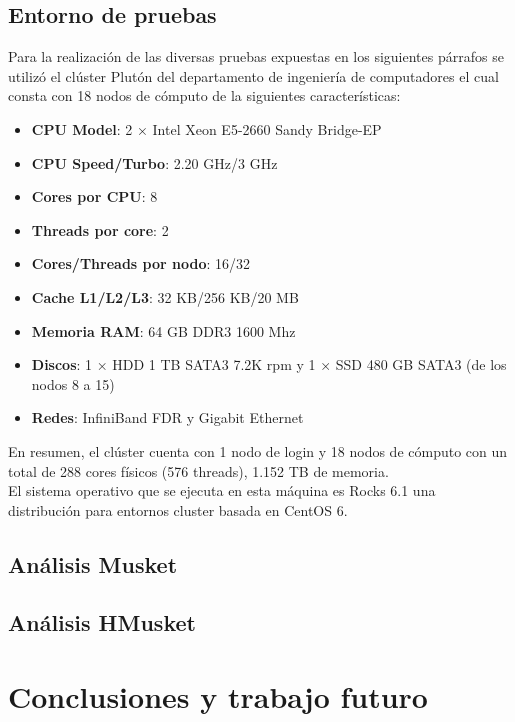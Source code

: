 \documentclass[conference]{IEEEtran}
\begin{document}
\subsection{Entorno de pruebas}
Para la realización de las diversas pruebas expuestas en los siguientes párrafos se utilizó el clúster Plutón del departamento de ingeniería de computadores el cual consta con 18 nodos de cómputo de la siguientes características: 

\begin{itemize}
	\item \textbf{CPU Model}: 2 × Intel Xeon E5-2660 Sandy Bridge-EP
	\item \textbf{CPU Speed/Turbo}: 2.20 GHz/3 GHz
	\item \textbf{Cores por CPU}: 8
	\item \textbf{Threads por core}: 2
	\item \textbf{Cores/Threads por nodo}: 16/32
	\item \textbf{Cache L1/L2/L3}: 32 KB/256 KB/20 MB
	\item \textbf{Memoria RAM}: 64 GB DDR3 1600 Mhz
	\item \textbf{Discos}: 1 × HDD 1 TB SATA3 7.2K rpm y 1 × SSD 480 GB SATA3 (de los nodos 8 a 15)
	\item \textbf{Redes}: InfiniBand FDR y Gigabit Ethernet
\end{itemize}

En resumen, el clúster cuenta con 1 nodo de login y 18 nodos de cómputo con un total de 288 cores físicos (576 threads), 1.152 TB de memoria.\\

El sistema operativo que se ejecuta en esta máquina es Rocks 6.1 una distribución para entornos cluster basada en CentOS 6.

\subsection{Análisis Musket}

\subsection{Análisis HMusket}

\section{Conclusiones y trabajo futuro}
\end{document}
